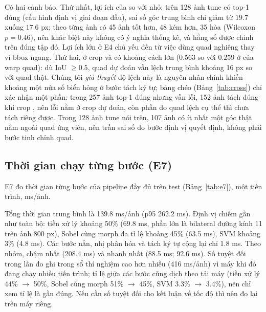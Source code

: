Có hai cảnh báo. Thứ nhất, lợi ích của  so với  nhỏ: trên 128 ảnh tune có top-1 đúng (cấu hình định vị giai đoạn đầu), sai số góc trung bình chỉ giảm từ $19.7$ xuống $17.6$ px; theo từng ảnh có 45 ảnh tốt hơn, 48 kém hơn, 35 hòa (Wilcoxon $p=0.46$), nên khác biệt này không có ý nghĩa thống kê, và hằng số được chỉnh trên đúng tập đó. Lợi ích lớn ở E4 chủ yếu đến từ việc dùng quad nghiêng thay vì bbox ngang. Thứ hai, ở crop  và  có khoảng cách lớn ($0.563$ so với $0.259$ ở  của warp quad): dù IoU $\ge 0.5$, quad dự đoán vẫn lệch trung bình khoảng 16 px so với quad thật. Chúng tôi \emph{giả thuyết} độ lệch này là nguyên nhân chính khiến khoảng một nửa số biển hỏng ở bước tách ký tự; bảng chéo (Bảng~\ref{tab:cross}) chỉ xác nhận một phần: trong 257 ảnh top-1 đúng nhưng vẫn lỗi, 152 ảnh tách đúng khi crop , nên lỗi nằm ở crop dự đoán, còn phần do quad lệch cụ thể thì chưa tách riêng được. Trong 128 ảnh tune nói trên, 107 ảnh có ít nhất một góc thật nằm ngoài quad ứng viên, nên trần sai số do bước định vị quyết định, không phải bước tinh chỉnh quad.

\subsection{Thời gian chạy từng bước (E7)}
\label{sec:e7}

E7 đo thời gian từng bước của pipeline đầy đủ trên test (Bảng~\ref{tab:e7}), một tiến trình, ms/ảnh.

\begin{table}[htbp]
\centering
\caption{E7: thời gian từng bước, tập test, dòng ALL (ms/ảnh). Nguồn: . Bước ``Sobel, morph, lọc, NMS'' được ước lượng bằng hiệu thời gian  trừ thời gian tiền xử lý đo riêng. 30 ảnh không có ứng viên nên các bước sau định vị chỉ có $n=432$.}
\label{tab:e7}
\small

\end{table}

Tổng thời gian trung bình là 139.8 ms/ảnh (p95 262.2 ms). Định vị chiếm gần như toàn bộ: tiền xử lý khoảng 50\% (69.8 ms, phần lớn là bilateral đường kính 11 trên ảnh 800 px), Sobel cùng morph đa tỉ lệ khoảng 45\% (63.5 ms), SVM khoảng 3\% (4.8 ms). Các bước nắn, nhị phân hóa và tách ký tự cộng lại chỉ 1.8 ms. Theo nhóm,  chậm nhất (208.4 ms) và  nhanh nhất (88.5 ms;  92.6 ms). Số tuyệt đối trong lần đo ghi trong sổ thí nghiệm cao hơn nhiều (416 ms/ảnh) vì máy khi đó đang chạy nhiều tiến trình; tỉ lệ giữa các bước cũng dịch theo tải máy (tiền xử lý 44\% $\to$ 50\%, Sobel cùng morph 51\% $\to$ 45\%, SVM 3.3\% $\to$ 3.4\%), nên chỉ xem tỉ lệ là gần đúng. Nếu cần số tuyệt đối cho kết luận về tốc độ thì nên đo lại trên máy riêng.
